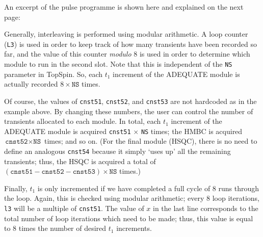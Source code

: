 \documentclass[a4paper,12pt]{article}
\newcommand{\nitrogen}{\ch{^{15}N}}
\begin{document}
\begin{refsection}
An excerpt of the pulse programme is shown here and explained on the next page:

{\singlespacing
{}
}

Generally, interleaving is performed using modular arithmetic.
A loop counter (\texttt{L3}) is used in order to keep track of how many transients have been recorded so far, and the value of this counter \textit{modulo} 8 is used in order to determine which module to run in the second slot.
Note that this is independent of the \texttt{NS} parameter in TopSpin.
So, each $t_1$ increment of the ADEQUATE module is actually recorded $8 \times \texttt{NS}$ times.

Of course, the values of \texttt{cnst51}, \texttt{cnst52}, and \texttt{cnst53} are not hardcoded as in the example above.
By changing these numbers, the user can control the number of transients allocated to each module.
In total, each $t_1$ increment of the ADEQUATE module is acquired \texttt{cnst51} $\times$ \texttt{NS} times; the \nitrogen{} HMBC is acquired $\texttt{cnst52} \times \texttt{NS}$ times; and so on.
(For the final module (HSQC), there is no need to define an analogous \texttt{cnst54} because it simply `uses up' all the remaining transients; thus, the HSQC is acquired a total of $(\texttt{cnst51} - \texttt{cnst52} - \texttt{cnst53}) \times \texttt{NS}$ times.)

Finally, $t_1$ is only incremented if we have completed a full cycle of 8 runs through the loop.
Again, this is checked using modular arithmetic; every 8 loop iterations, \texttt{l3} will be a multiple of \texttt{cnst51}.
The value of $x$ in the last line corresponds to the total number of loop iterations which need to be made; thus, this value is equal to 8 times the number of desired $t_1$ increments.


\end{refsection}
\end{document}
